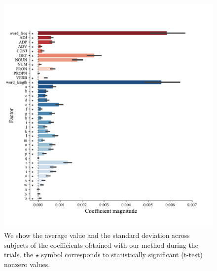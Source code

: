 \documentclass{article}
\begin{document}
\begin{figure}[h]
  \centering
  \includegraphics[width=\textwidth, trim=0cm 0cm 0cm 0cm]{figures/pvalues_vertical.pdf}
  \caption{We show the average value and the standard deviation across subjects of the coefficients obtained with our method during the trials. the $\star$  symbol corresponds to statistically significant (t-test) nonzero values.}
  \label{fig:ridgebaselineresult}
\end{figure}
\end{document}
